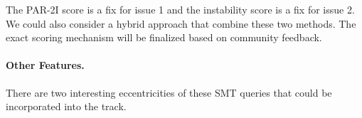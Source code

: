 \documentclass[
]{ceurart}
\begin{document}


The PAR-2I score is a fix for issue 1 and the instability score is a fix for issue 2. We could also consider a hybrid approach that combine these two methods. The exact scoring mechanism will be finalized based on community feedback.

\paragraph{Other Features.} There are two interesting eccentricities of these
SMT queries that could be incorporated into the track.
\end{document}
